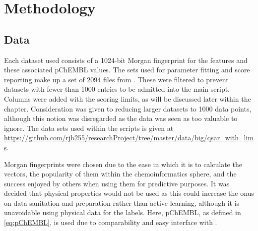 \chapter{Methodology}
\label{ch:method}

\graphicspath{{Chapter3/Figs/Vector/}{Chapter3/Figs/}}

\section{Data}
Each dataset used consists of a 1024-bit Morgan fingerprint for the features and these associated pChEMBL values. The sets used for parameter fitting and score reporting make up a set of 2094 files from \textcite{CHEMBL}. These were filtered to prevent datasets with fewer than 1000 entries to be admitted into the main script. Columns were added with the scoring limits, as will be discussed later within the chapter. Consideration was given to reducing larger datasets to 1000 data points, although this notion was disregarded as the data was seen as too valuable to ignore. The data sets used within the scripts is given at \url{https://github.com/rjb255/researchProject/tree/master/data/big/qsar_with_lims}.

Morgan fingerprints were chosen due to the ease in which it is to calculate the vectors, the popularity of them within the chemoinformatics sphere, and the success enjoyed by others when using them for predictive purposes. It was decided that physical properties would not be used as this could increase the onus on data sanitation and preparation rather than active learning, although it is unavoidable using physical data for the labels. Here, pChEMBL, as defined in \ref{eq:pChEMBL}, is used due to comparability and easy interface with \textcite{CHEMBL}.

